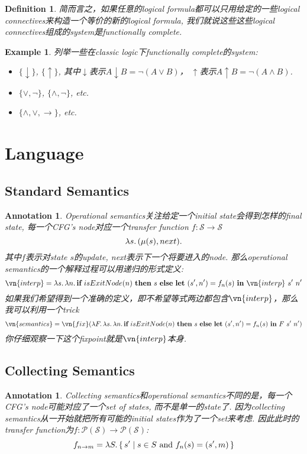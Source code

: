 \documentclass{article}
\newtheorem{example}[theorem]{Example}
\newtheorem{definition}[theorem]{Definition}
\newtheorem{annotation}[theorem]{Annotation}
\newcommand\Set[2]{\{\,#1\mid#2\,\}} %
\newcommand{\lam}[2]{\ensuremath{\lambda #1\ldotp #2}} %
\newcommand{\ifelse}[3]{\ensuremath{\textbf{if}~#1~\textbf{then}~#2~\textbf{else}~#3}}
\begin{document}
\begin{definition}
\rm 简而言之，如果任意的logical formula都可以只用给定的一些logical connectives来构造一个等价的新的logical formula, 我们就说这些这些logical connectives组成的system是functionally complete. 
\end{definition}

\begin{example}
\rm 列举一些在classic logic下functionally complete的system:
\begin{itemize}
	\item $\{\downarrow\}$, $\{\uparrow\}$, 其中$\downarrow$表示$A \downarrow B = \neg (A \vee B)$， $\uparrow$表示$A \uparrow B = \neg (A \wedge B)$.
	\item $\{\vee ,\neg \}$, $\{\wedge ,\neg \}$, etc.
	\item $\{\land ,\lor ,\rightarrow \}$, etc.
\end{itemize}
\end{example}

\section{Language}

\subsection{Standard Semantics}

\begin{annotation}
\rm Operational semantics关注给定一个initial state会得到怎样的final state, 每一个CFG's node对应一个transfer function $f:\mathcal{S} \to \mathcal{S}$
\[
	\lam{s}{(\mu(s),next)}.
\]
其中$f$表示对state $s$的update, next表示下一个将要进入的node. 那么operational semantics的一个解释过程可以用递归的形式定义:
\[
	\vn{interp} = \lam{s}{\lam{n}{\ifelse{isExitNode(n)}{s}{\mathbf{let}~(s',n')=f_n(s)~\mathbf{in}~\vn{interp}~s'~n'}}}
\]
如果我们希望得到一个准确的定义，即不希望等式两边都包含$\vn{interp}$，那么我可以利用一个trick
\[
\vn{semantics} = \vn{fix}(\lam{F}{\lam{s}{\lam{n}{\ifelse{isExitNode(n)}{s}{\mathbf{let}~(s',n')=f_n(s)~\mathbf{in}~F~s'~n'}}}})
\]
你仔细观察一下这个fixpoint就是$\vn{interp}$本身.
\end{annotation}

\subsection{Collecting Semantics}

\begin{annotation}
\rm Collecting semantics和operational semantics不同的是，每一个CFG's node可能对应了一个set of states, 而不是单一的state了. 因为collecting semantics从一开始就把所有可能的initial states作为了一个set来考虑. 因此此时的transfer function为$f:\mathcal{P}(\mathcal{S}) \to \mathcal{P}(\mathcal{S})$:
\[
f_{n \to m} = \lam{S}{\Set{s'}{s \in S ~\text{and}~f_n(s)=(s',m)}}
\]
\end{annotation}
\end{document}
